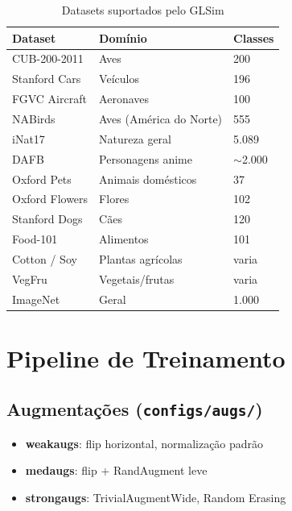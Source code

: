 \documentclass[a4paper,12pt]{scrartcl}
\newenvironment{compactitem}%
  {\begin{itemize}\setlength{\itemsep}{1pt}\setlength{\parsep}{0pt}}%
  {\end{itemize}}
\begin{document}
\begin{table}[h!]
  \centering
  \caption{Datasets suportados pelo GLSim}
  \begin{tabular}{lll}
    \toprule
    \textbf{Dataset}   & \textbf{Dom\'inio}            & \textbf{Classes} \\
    \midrule
    CUB-200-2011       & Aves                          & 200        \\
    Stanford Cars      & Ve\'iculos                    & 196        \\
    FGVC Aircraft      & Aeronaves                     & 100        \\
    NABirds            & Aves (Am\'erica do Norte)     & 555        \\
    iNat17             & Natureza geral                & 5.089      \\
    DAFB               & Personagens anime             & $\sim$2.000 \\
    Oxford Pets        & Animais dom\'esticos          & 37         \\
    Oxford Flowers     & Flores                        & 102        \\
    Stanford Dogs      & C\~aes                        & 120        \\
    Food-101           & Alimentos                     & 101        \\
    Cotton / Soy       & Plantas agr\'icolas           & varia      \\
    VegFru             & Vegetais/frutas               & varia      \\
    ImageNet           & Geral                         & 1.000      \\
    \bottomrule
  \end{tabular}
  \label{tab:datasets}
\end{table}

\section{Pipeline de Treinamento}

\subsection{Augmenta\c{c}\~oes (\texttt{configs/augs/})}

\begin{compactitem}
  \item \textbf{weakaugs}: flip horizontal, normaliza\c{c}\~ao padr\~ao
  \item \textbf{medaugs}: flip + RandAugment leve
  \item \textbf{strongaugs}: TrivialAugmentWide, Random Erasing
\end{compactitem}
\end{document}
